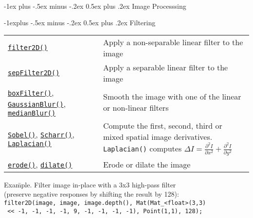 \documentclass[10pt,landscape]{article}
\makeatletter
\renewcommand{\section}{\@startsection{section}{1}{0mm}%
                                {-1ex plus -.5ex minus -.2ex}%
                                {0.5ex plus .2ex}%
                                {\normalfont\large\bfseries}}
\renewcommand{\subsection}{\@startsection{subsection}{2}{0mm}%
                                {-1explus -.5ex minus -.2ex}%
                                {0.5ex plus .2ex}%
                                {\normalfont\normalsize\bfseries}}
\makeatother
\begin{document}
\begin{multicols}{3}
\section{Image Processsing}

\subsection{Filtering}

\begin{tabular}{@{}p{\the\MyLen}%
                @{}p{\linewidth-\the\MyLen}@{}}
\texttt{\href{http://opencv.willowgarage.com/documentation/cpp/image_filtering.html\#cv-filter2d}{filter2D()}} & Apply a non-separable linear filter to the image \\

\texttt{\href{http://opencv.willowgarage.com/documentation/cpp/image_filtering.html\#cv-sepfilter2d}{sepFilter2D()}} & Apply a separable linear filter to the image \\

\texttt{\href{http://opencv.willowgarage.com/documentation/cpp/image_filtering.html\#cv-blur}{boxFilter()}},  \texttt{\href{http://opencv.willowgarage.com/documentation/cpp/image_filtering.html\#cv-gaussianblur}{GaussianBlur()}},
\texttt{\href{http://opencv.willowgarage.com/documentation/cpp/image_filtering.html\#cv-medianblur}{medianBlur()}}
& Smooth the image with one of the linear or non-linear filters \\

\texttt{\href{http://opencv.willowgarage.com/documentation/cpp/image_filtering.html\#cv-sobel}{Sobel()}},  \texttt{\href{http://opencv.willowgarage.com/documentation/cpp/image_filtering.html\#cv-scharr}{Scharr()}},
\texttt{\href{http://opencv.willowgarage.com/documentation/cpp/image_filtering.html\#cv-laplacian}{Laplacian()}}
& Compute the first, second, third or mixed spatial image derivatives. \texttt{Laplacian()} computes $\Delta I = \frac{\partial ^ 2 I}{\partial x^2} + \frac{\partial ^ 2 I}{\partial y^2}$  \\

\texttt{\href{http://opencv.willowgarage.com/documentation/cpp/image_filtering.html\#cv-erode}{erode()}}, \texttt{\href{http://opencv.willowgarage.com/documentation/cpp/image_filtering.html\#cv-dilate}{dilate()}} & Erode or dilate the image \\

\end{tabular}

\begin{tabbing}
Exa\=mple. Filter image in-place with a 3x3 high-pass filter\\
\> (preserve negative responses by shifting the result by 128):\\
\texttt{filter2D(image, image, image.depth(), Mat(Mat\_<float>(3,3)}\\
\> \texttt{ << -1, -1, -1, -1, 9, -1, -1, -1, -1), Point(1,1), 128);}\\
\end{tabbing}


\end{multicols}
\end{document}
